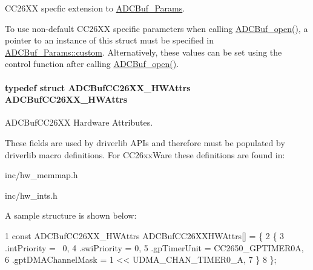 C\+C26\+X\+X specfic extension to \hyperlink{struct_a_d_c_buf___params}{A\+D\+C\+Buf\+\_\+\+Params}. 

To use non-\/default C\+C26\+X\+X specific parameters when calling \hyperlink{_a_d_c_buf_8h_a0b63bca2e8f8e5b58f0c657ac662c97b}{A\+D\+C\+Buf\+\_\+open()}, a pointer to an instance of this struct must be specified in \hyperlink{struct_a_d_c_buf___params_a72c7ec51318ec2f8fcf5d2ff37de33e3}{A\+D\+C\+Buf\+\_\+\+Params\+::custom}. Alternatively, these values can be set using the control function after calling \hyperlink{_a_d_c_buf_8h_a0b63bca2e8f8e5b58f0c657ac662c97b}{A\+D\+C\+Buf\+\_\+open()}. 
\paragraph[{A\+D\+C\+Buf\+C\+C26\+X\+X\+\_\+\+H\+W\+Attrs}]{\setlength{\rightskip}{0pt plus 5cm}typedef struct {\bf A\+D\+C\+Buf\+C\+C26\+X\+X\+\_\+\+H\+W\+Attrs}  {\bf A\+D\+C\+Buf\+C\+C26\+X\+X\+\_\+\+H\+W\+Attrs}}\label{_a_d_c_buf_c_c26_x_x_8h_a22b04734af9e7cbaa1915f92942918fc}


A\+D\+C\+Buf\+C\+C26\+X\+X Hardware Attributes. 

These fields are used by driverlib A\+P\+Is and therefore must be populated by driverlib macro definitions. For C\+C26xx\+Ware these definitions are found in\+:
\begin{DoxyItemize}
\item inc/hw\+\_\+memmap.\+h
\item inc/hw\+\_\+ints.\+h
\end{DoxyItemize}

A sample structure is shown below\+: 
\begin{DoxyCode}
1 const ADCBufCC26XX\_HWAttrs ADCBufCC26XXHWAttrs[] = \{
2     \{
3         .intPriority = ~0,
4         .swiPriority = 0,
5         .gpTimerUnit = CC2650\_GPTIMER0A,
6         .gptDMAChannelMask = 1 << UDMA\_CHAN\_TIMER0\_A,
7     \}
8 \};
\end{DoxyCode}
